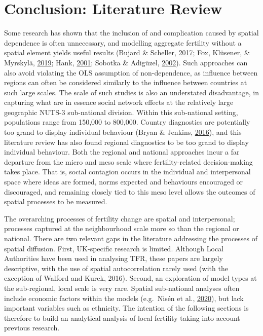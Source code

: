 \documentclass[12pt,twoside]{reedthesis}
\begin{document}
\hypertarget{conclusion-literature-review}{%
\section{Conclusion: Literature Review}\label{conclusion-literature-review}}

Some research has shown that the inclusion of and complication caused by spatial dependence is often unnecessary, and modelling aggregate fertility without a spatial element yields useful results (Bujard \& Scheller, \protect\hyperlink{ref-bujard2017}{2017}; Fox, Klüsener, \& Myrskylä, \protect\hyperlink{ref-fox2019}{2019}; Hank, \protect\hyperlink{ref-hank2001}{2001}; Sobotka \& Adigüzel, \protect\hyperlink{ref-sobotka2002}{2002}). Such approaches can also avoid violating the OLS assumption of non-dependence, as influence between regions can often be considered similarly to the influence between countries at such large scales. The scale of such studies is also an understated disadvantage, in capturing what are in essence social network effects at the relatively large geographic NUTS-3 sub-national division. Within this sub-national setting, populations range from 150,000 to 800,000. Country diagnostics are potentially too grand to display individual behaviour (Bryan \& Jenkins, \protect\hyperlink{ref-bryan2016}{2016}), and this literature review has also found regional diagnostics to be too grand to display individual behaviour. Both the regional and national approaches incur a far departure from the micro and meso scale where fertility-related decision-making takes place. That is, social contagion occurs in the individual and interpersonal space where ideas are formed, norms expected and behaviours encouraged or discouraged, and remaining closely tied to this meso level allows the outcomes of spatial processes to be measured.

The overarching processes of fertility change are spatial and interpersonal; processes captured at the neighbourhood scale more so than the regional or national. There are two relevant gaps in the literature addressing the processes of spatial diffusion. First, UK-specific research is limited. Although Local Authorities have been used in analysing TFR, these papers are largely descriptive, with the use of spatial autocorrelation rarely used (with the exception of Walford and Kurek, 2016). Second, an exploration of model types at the sub-regional, local scale is very rare. Spatial sub-national analyses often include economic factors within the models (e.g.~Nisén et al., \protect\hyperlink{ref-nisen2020}{2020}), but lack important variables such as ethnicity. The intention of the following sections is therefore to build an analytical analysis of local fertility taking into account previous research.
\end{document}
